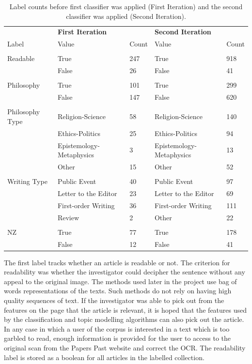 \documentclass{article}
\begin{document}
\begin{table}[]
        \centering
        \footnotesize
        \begin{tabular}{l|ll|ll}
          & \textbf{First Iteration} & & \textbf{Second Iteration}  & \\
          Label & Value & Count & Value & Count \\
          \hline
          & & & &  \\
        	Readable & True & 247 & True & 918 \\
        	& False & 26 & False & 41 \\
          & & & &  \\
          Philosophy & True & 101 & True & 299 \\
          & False & 147 & False & 620 \\
          & & & &  \\
          Philosophy Type & Religion-Science & 58 & Religion-Science & 140 \\
          & Ethics-Politics & 25 &  Ethics-Politics & 94 \\
          & Epistemology-Metaphysics & 3 & Epistemology-Metaphysics & 13 \\
          & Other & 15 &  Other & 52 \\
          & & & &  \\
          Writing Type & Public Event & 40 & Public Event & 97 \\
          & Letter to the Editor & 23 &  Letter to the Editor & 69 \\
          & First-order Writing & 36 &  First-order Writing & 111 \\
          & Review & 2 &  Other & 22 \\
          & & & &  \\
          NZ & True & 77 & True & 178 \\
          & False & 12 & False & 41 \\
        \end{tabular}
        \caption{Label counts before first classifier was applied (First Iteration) and the second classifier was applied (Second Iteration).}
        \label{t:labels}
\end{table}

The first label tracks whether an article is readable or not. The criterion for readability was whether the investigator could decipher the sentence without any appeal to the original image. The methods used later in the project use bag of words representations of the texts. Such methods do not rely on having high quality sequences of text. If the investigator was able to pick out from the features on the page that the article is relevant, it is hoped that the features used by the classification and topic modelling algorithms can also pick out the article. In any case in which a user of the corpus is interested in a text which is too garbled to read, enough information is provided for the user to access to the original scan from the Papers Past website and correct the OCR. The readability label is stored as a boolean for all articles in the labelled collection.
\end{document}

